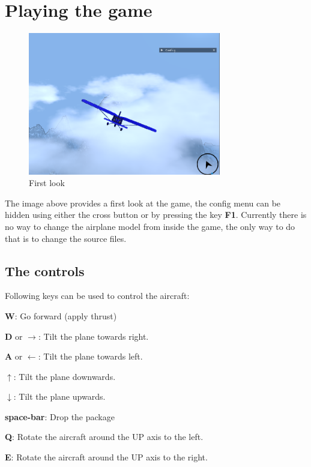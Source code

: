 \section{Playing the game}

\begin{figure}[H]
    \centering
    \includegraphics[width=0.75\textwidth]{images/game1.png}
    \caption{First look}
    \label{fig:first-look}
\end{figure}


The image above provides a first look at the game, the config menu can be hidden using either the cross button or by pressing the key \textbf{F1}. Currently there is no way to change the airplane model from inside the game, the only way to do that is to change the source files.

\bigskip

\subsection{The controls}

Following keys can be used to control the aircraft:
\begin{compactdesc}
  \item[\textbf{W}:] Go forward (apply thrust)
  \item[\textbf{D} or $\rightarrow$:] Tilt the plane towards right.
  \item[\textbf{A} or $\leftarrow$:] Tilt the plane towards left.
  \item[$\uparrow$:] Tilt the plane downwards.
  \item[$\downarrow$:] Tilt the plane upwards.
  \item[\textbf{space-bar}:] Drop the package
  \item[\textbf{Q}:] Rotate the aircraft around the UP axis to the left.
  \item[\textbf{E}:] Rotate the aircraft around the UP axis to the right.
\end{compactdesc}


